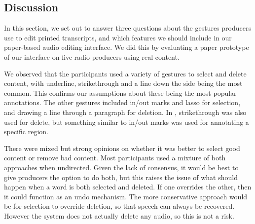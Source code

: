 

\subsection{Discussion}

In this section, we set out to answer three questions about the gestures producers use to edit printed transcripts, and
which features we should include in our paper-based audio editing interface. We did this by evaluating a paper
prototype of our interface on five radio producers using real content.


We observed that the participants used a variety of gestures to select and delete content, with underline,
strikethrough and a line down the side being the most common.  This confirms our assumptions about these being the most
popular annotations. The other gestures included in/out marks and lasso for selection, and drawing a line through a
paragraph for deletion.  In \citet{Weibel2008}, strikethrough was also used for delete, but something similar to in/out
marks was used for annotating a specific region.

There were mixed but strong opinions on whether it was better to select good content or remove bad content.  Most
participants used a mixture of both approaches when undirected. Given the lack of consensus, it would be best to give
producers the option to do both, but this raises the issue of what should happen when a word is both selected and
deleted.  If one overrides the other, then it could function as an undo mechanism. The more conservative approach would
be for selection to override deletion, so that speech can always be recovered. However the system does not actually
delete any audio, so this is not a risk.

